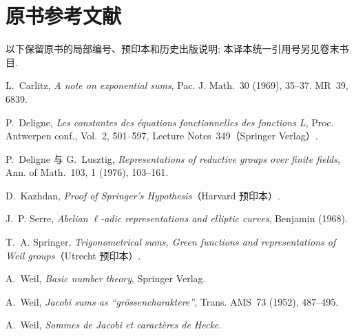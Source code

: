 \section*{原书参考文献}
\begingroup\small\raggedright
\noindent 以下保留原书的局部编号、预印本和历史出版说明; 本译本统一引用号另见卷末书目.
\begin{enumerate}[{[1]}]
\item L.~Carlitz, \emph{A note on exponential sums}, Pac. J. Math.~30 (1969), 35--37. MR~39, 6839.
\item P.~Deligne, \emph{Les constantes des équations fonctionnelles des fonctions L}, Proc. Antwerpen conf., Vol.~2, 501--597, Lecture Notes~349（Springer Verlag）.
\item P.~Deligne 与 G.~Lusztig, \emph{Representations of reductive groups over finite fields}, Ann. of Math.~103, 1 (1976), 103--161.
\item D.~Kazhdan, \emph{Proof of Springer's Hypothesis}（Harvard 预印本）.
\item J.~P. Serre, \emph{Abelian $\ell$-adic representations and elliptic curves}, Benjamin (1968).
\item T.~A. Springer, \emph{Trigonometrical sums, Green functions and representations of Weil groups}（Utrecht 预印本）.
\item A.~Weil, \emph{Basic number theory}, Springer Verlag.
\item A.~Weil, \emph{Jacobi sums as ``grössencharaktere''}, Trans. AMS~73 (1952), 487--495.
\item A.~Weil, \emph{Sommes de Jacobi et caractères de Hecke}.
\end{enumerate}
\endgroup
